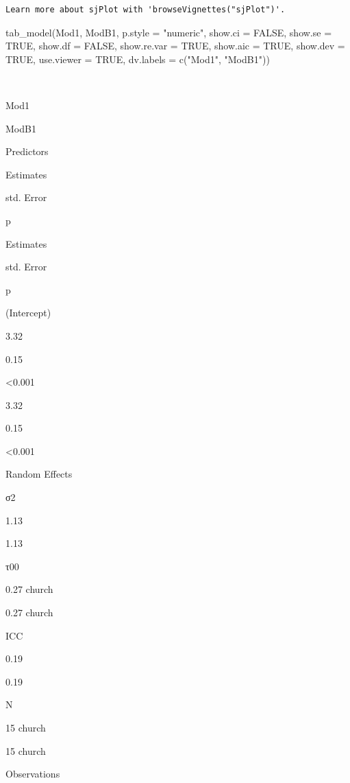 \documentclass[
  11pt,
]{book}
\newenvironment{Shaded}{\begin{snugshade}}{\end{snugshade}}
\newcommand{\AttributeTok}[1]{\textcolor[rgb]{0.77,0.63,0.00}{#1}}
\newcommand{\ConstantTok}[1]{\textcolor[rgb]{0.00,0.00,0.00}{#1}}
\newcommand{\FunctionTok}[1]{\textcolor[rgb]{0.00,0.00,0.00}{#1}}
\newcommand{\NormalTok}[1]{#1}
\newcommand{\StringTok}[1]{\textcolor[rgb]{0.31,0.60,0.02}{#1}}
\begin{document}
\begin{verbatim}
Learn more about sjPlot with 'browseVignettes("sjPlot")'.
\end{verbatim}

\begin{Shaded}
\begin{Highlighting}[]
\FunctionTok{tab\_model}\NormalTok{(Mod1, ModB1, }\AttributeTok{p.style =} \StringTok{"numeric"}\NormalTok{, }\AttributeTok{show.ci =} \ConstantTok{FALSE}\NormalTok{, }\AttributeTok{show.se =} \ConstantTok{TRUE}\NormalTok{, }\AttributeTok{show.df =} \ConstantTok{FALSE}\NormalTok{, }\AttributeTok{show.re.var =} \ConstantTok{TRUE}\NormalTok{, }\AttributeTok{show.aic =} \ConstantTok{TRUE}\NormalTok{, }\AttributeTok{show.dev =} \ConstantTok{TRUE}\NormalTok{, }\AttributeTok{use.viewer =} \ConstantTok{TRUE}\NormalTok{, }\AttributeTok{dv.labels =} \FunctionTok{c}\NormalTok{(}\StringTok{"Mod1"}\NormalTok{, }\StringTok{"ModB1"}\NormalTok{))}
\end{Highlighting}
\end{Shaded}

~

Mod1

ModB1

Predictors

Estimates

std. Error

p

Estimates

std. Error

p

(Intercept)

3.32

0.15

\textless0.001

3.32

0.15

\textless0.001

Random Effects

σ2

1.13

1.13

τ00

0.27 church

0.27 church

ICC

0.19

0.19

N

15 church

15 church

Observations
\end{document}

